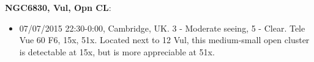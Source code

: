 {\bf NGC6830, Vul, Opn CL}:
\begin{itemize}
\item 07/07/2015 22:30-0:00, Cambridge, UK. 3 - Moderate seeing, 5 - Clear. Tele Vue 60 F6, 15x, 51x. Located next to 12 Vul, this medium-small open cluster is detectable at 15x, but is more appreciable at 51x.
\end{itemize}
